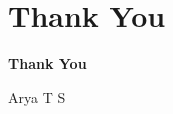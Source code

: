 \section{Thank You}

\begin{frame}

\centering

\vspace{1.5cm}

{\Huge \textbf{Thank You}}

\vfill

{\normalsize Arya T S}

\end{frame}